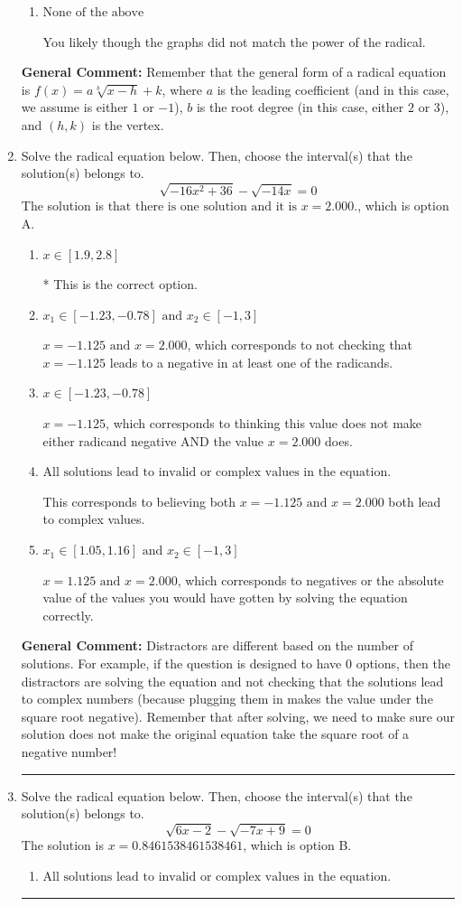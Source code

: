 \documentclass{extbook}[14pt]
\newcommand{\litem}[1]{\item #1

\rule{\textwidth}{0.4pt}}
\begin{document}
\begin{enumerate}
{\begin{enumerate}[label=\Alph*.]
This corresponds to the correct coefficient and switching the $x$-value of the vertex with the root degree as $2$.
\item \( \text{None of the above} \)

You likely though the graphs did not match the power of the radical.
\end{enumerate}

\textbf{General Comment:} Remember that the general form of a radical equation is $ f(x) = a \sqrt[b]{x - h} + k$, where $a$ is the leading coefficient (and in this case, we assume is either $1$ or $-1$), $b$ is the root degree (in this case, either $2$ or $3$), and $(h, k)$ is the vertex.
}
\litem{
Solve the radical equation below. Then, choose the interval(s) that the solution(s) belongs to.
\[ \sqrt{-16 x^2 + 36} - \sqrt{-14 x} = 0 \]The solution is \( \text{that there is one solution and it is } x = 2.000. \), which is option A.\begin{enumerate}[label=\Alph*.]
\item \( x \in [1.9,2.8] \)

* This is the correct option.
\item \( x_1 \in [-1.23, -0.78] \text{ and } x_2 \in [-1,3] \)

$x = -1.125 \text{ and } x = 2.000$, which corresponds to not checking that $x = -1.125$ leads to a negative in at least one of the radicands.
\item \( x \in [-1.23,-0.78] \)

$x = -1.125$, which corresponds to thinking this value does not make either radicand negative AND the value $x = 2.000$ does.
\item \( \text{All solutions lead to invalid or complex values in the equation.} \)

This corresponds to believing both $x = -1.125 \text{ and } x = 2.000$ both lead to complex values.
\item \( x_1 \in [1.05, 1.16] \text{ and } x_2 \in [-1,3] \)

$x = 1.125 \text{ and } x = 2.000$, which corresponds to negatives or the absolute value of the values you would have gotten by solving the equation correctly.
\end{enumerate}

\textbf{General Comment:} Distractors are different based on the number of solutions. For example, if the question is designed to have 0 options, then the distractors are solving the equation and not checking that the solutions lead to complex numbers (because plugging them in makes the value under the square root negative). Remember that after solving, we need to make sure our solution does not make the original equation take the square root of a negative number!
}
\litem{
Solve the radical equation below. Then, choose the interval(s) that the solution(s) belongs to.
\[ \sqrt{6 x - 2} - \sqrt{-7 x + 9} = 0 \]The solution is \( x = 0.8461538461538461 \), which is option B.\begin{enumerate}[label=\Alph*.]
\item \( \text{All solutions lead to invalid or complex values in the equation.} \)


\end{enumerate}}
\end{enumerate}
\end{document}
